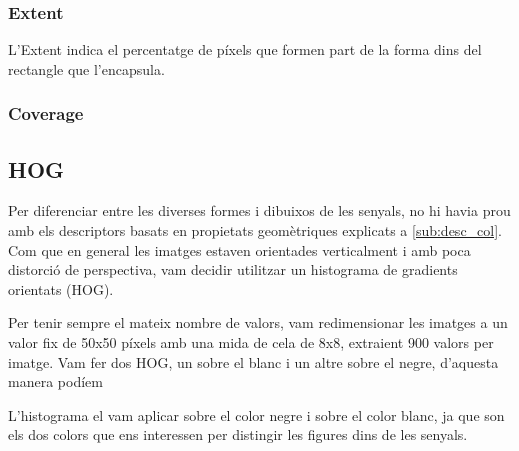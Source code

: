 \subsubsection{Extent}

L'Extent indica el percentatge de píxels que formen part de la forma dins del rectangle que l'encapsula.

\subsubsection{Coverage}

\subsection{HOG}%
\label{sub:HOG}

Per diferenciar entre les diverses formes i dibuixos de les senyals, no hi havia prou amb els descriptors basats en
propietats geomètriques explicats a \cref{sub:desc_col}. Com que en general les imatges estaven orientades verticalment
i amb poca distorci\'o de perspectiva, vam decidir utilitzar un histograma de gradients orientats (HOG).

Per tenir sempre el mateix nombre de valors, vam redimensionar les imatges a un valor fix de 50x50 píxels amb
una mida de cela de 8x8, extraient  900 valors per imatge. Vam fer dos HOG, un sobre el blanc i un altre sobre el negre,
d'aquesta manera podíem 

L'histograma el vam aplicar sobre el color negre i sobre el color
blanc, ja que son els dos colors que ens interessen per distingir les figures dins de les senyals.


